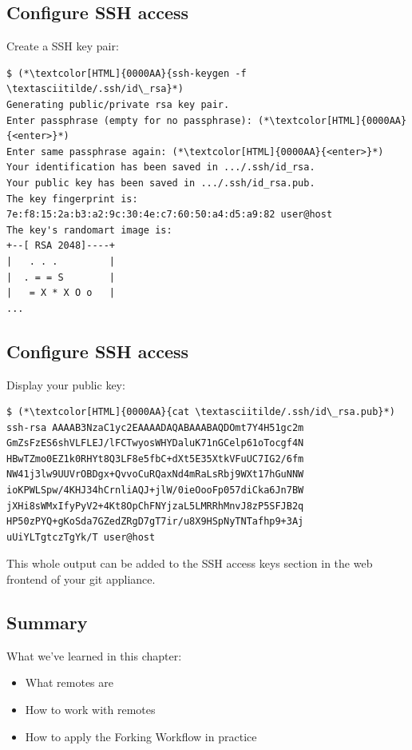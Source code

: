 \subsection{Configure SSH access}
\begin{frame}[fragile]
  \subslidetitle
  Create a SSH key pair:
  \begin{lstlisting}
$ (*\textcolor[HTML]{0000AA}{ssh-keygen -f \textasciitilde/.ssh/id\_rsa}*)
Generating public/private rsa key pair.
Enter passphrase (empty for no passphrase): (*\textcolor[HTML]{0000AA}{<enter>}*)
Enter same passphrase again: (*\textcolor[HTML]{0000AA}{<enter>}*)
Your identification has been saved in .../.ssh/id_rsa.
Your public key has been saved in .../.ssh/id_rsa.pub.
The key fingerprint is:
7e:f8:15:2a:b3:a2:9c:30:4e:c7:60:50:a4:d5:a9:82 user@host
The key's randomart image is:
+--[ RSA 2048]----+
|   . . .         |
|  . = = S        |
|   = X * X O o   |
...
\end{lstlisting}
\end{frame}

\subsection{Configure SSH access}
\begin{frame}[fragile]
  \subslidetitle
  Display your public key:
  \begin{lstlisting}
$ (*\textcolor[HTML]{0000AA}{cat \textasciitilde/.ssh/id\_rsa.pub}*)
ssh-rsa AAAAB3NzaC1yc2EAAAADAQABAAABAQDOmt7Y4H51gc2m
GmZsFzES6shVLFLEJ/lFCTwyosWHYDaluK71nGCelp61oTocgf4N
HBwTZmo0EZ1k0RHYt8Q3LF8e5fbC+dXt5E35XtkVFuUC7IG2/6fm
NW41j3lw9UUVrOBDgx+QvvoCuRQaxNd4mRaLsRbj9WXt17hGuNNW
ioKPWLSpw/4KHJ34hCrnliAQJ+jlW/0ieOooFp057diCka6Jn7BW
jXHi8sWMxIfyPyV2+4Kt8OpChFNYjzaL5LMRRhMnvJ8zP5SFJB2q
HP50zPYQ+gKoSda7GZedZRgD7gT7ir/u8X9HSpNyTNTafhp9+3Aj
uUiYLTgtczTgYk/T user@host
\end{lstlisting}

  This whole output can be added to the SSH access keys
  section in the web frontend of your git appliance.
\end{frame}

\subsection{Summary}
\begin{frame}[fragile]
\subslidetitle
  What we've learned in this chapter:
  \begin{itemize}
    \item What remotes are
    \item How to work with remotes
    \item How to apply the Forking Workflow in practice
  \end{itemize}
\end{frame}
